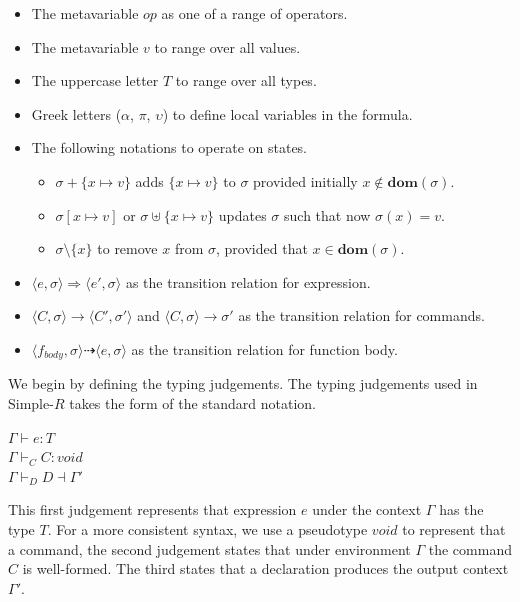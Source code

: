 \documentclass[a4paper,12pt]{report}
\begin{document}
\renewcommand\labelitemii{$\blacksquare$}
\begin{itemize}
  \item The metavariable $op$ as one of a range of operators. 
  \item The metavariable $v$ to range over all values.
  \item The uppercase letter $T$ to range over all types.
  \item Greek letters ($\alpha$, $\pi$, $\upsilon$) to define local variables in 
  the formula. 
  \item The following notations to operate on states. 
    \begin{itemize}
      \item $\sigma + \{x \mapsto v\}$ adds $\{x \mapsto v\}$ to $\sigma$ provided initially $x \notin\textbf{dom}(\sigma)$. 
      \item $\sigma[x \mapsto v]$ or $\sigma \uplus \{x \mapsto v\}$ updates $\sigma$ such that now $\sigma(x) = v$.
      \item $\sigma \setminus \{x\}$ to remove $x$ from $\sigma$, provided that $x \in \textbf{dom}(\sigma)$.
    \end{itemize}
  \item $\langle e, \sigma \rangle \Longrightarrow \langle e', \sigma \rangle$ as the transition relation for expression.
  \item $\langle C, \sigma \rangle \longrightarrow \langle C', \sigma' \rangle$ and $\langle C, \sigma \rangle \longrightarrow \sigma'$ as the transition relation for commands.
  \item $\langle f_{body}, \sigma \rangle \dashrightarrow \langle e, \sigma \rangle$ as the transition relation for function body.
\end{itemize}

\par
We begin by defining the typing judgements. The typing judgements used in 
Simple-$R$ takes the form of the standard notation. 
\begin{center}
  $\Gamma \vdash e : T$\\
  $\Gamma \vdash_{C} C : void$\\
  $\Gamma \vdash_{D} D \dashv \Gamma'$\\
\end{center}
This first judgement represents that expression $e$ 
under the context $\Gamma$ has the type $T$. For a more consistent syntax, 
we use a pseudotype $void$ to represent that a command, the second judgement 
states that under environment $\Gamma$ the command $C$ is well-formed. 
The third states that a declaration produces the output context $\Gamma'$. 
\end{document}
